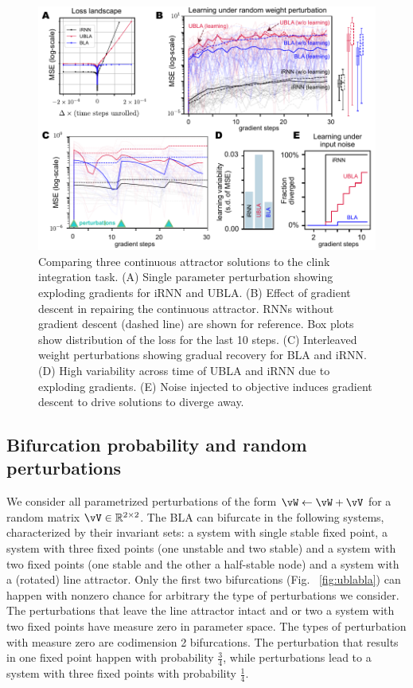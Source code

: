 \documentclass{article}
\newcounter{ct}
\theoremstyle{definition}
\theoremstyle{remark}
\begin{document}
\begin{figure}[thbp]
  \centering
  \includegraphics[width=\textwidth]{figures/threeIntegrators.pdf}
  \caption{
  Comparing three continuous attractor solutions to the clink integration task.
  (A) Single parameter perturbation showing exploding gradients for iRNN and UBLA.
  (B) Effect of gradient descent in repairing the continuous attractor. RNNs without gradient descent (dashed line) are shown for reference. Box plots show distribution of the loss for the last 10 steps.
  (C) Interleaved weight perturbations showing gradual recovery for BLA and iRNN.
  (D) High variability across time of UBLA and iRNN due to exploding gradients.
  (E) Noise injected to objective induces gradient descent to drive solutions to diverge away.
  }
  \label{fig:maintenance}
\end{figure}


\subsection{Bifurcation probability and random perturbations}
We consider all parametrized perturbations of the form $ \vW \leftarrow \vW + \vV$ for a random matrix $\vV\in \mathbb{R}^{2\times 2}$.
The BLA can bifurcate in the following systems, characterized by their invariant sets: a system with single stable fixed point, a system with three fixed points (one unstable and two stable) and  a system with two fixed points (one stable and the other a half-stable node) and a system with a (rotated) line attractor. 
Only the first two bifurcations (Fig. ~\ref{fig:ublabla}) can happen with nonzero chance for arbitrary the type of perturbations we consider.
The  perturbations that  leave the line attractor intact and or two a system with two fixed points have measure zero in parameter space.
The types of perturbation with measure zero are codimension 2 bifurcations.
The perturbation that results in one fixed point happen with probability $\frac{3}{4}$, while perturbations lead to a system with three fixed points with probability $\frac{1}{4}$.
\end{document}
